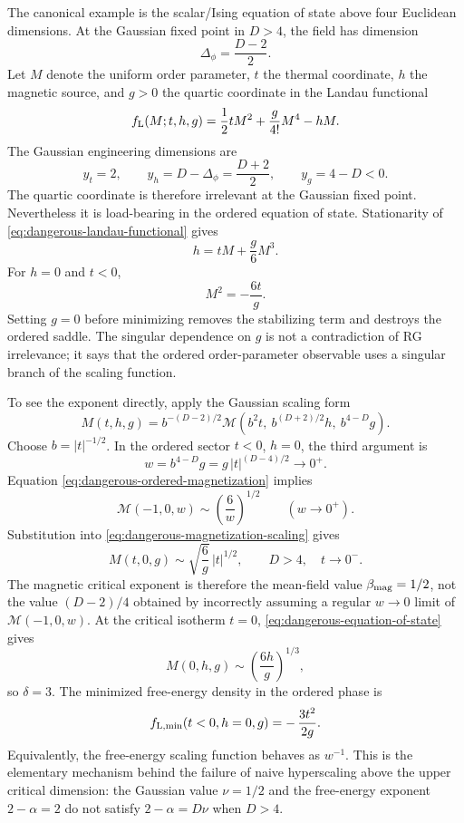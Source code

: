 The canonical example is the scalar/Ising equation of state above four
Euclidean dimensions.  At the Gaussian fixed point in \(D>4\), the field has
dimension
\[
  \Delta_\phi=\frac{D-2}{2}.
\]
Let \(M\) denote the uniform order parameter, \(t\) the thermal coordinate,
\(h\) the magnetic source, and \(g>0\) the quartic coordinate in the Landau
functional
\begin{equation}
  f_{\rm L}(M;t,h,g)
  =
  \frac12 tM^2+\frac{g}{4!}M^4-hM .
  \label{eq:dangerous-landau-functional}
\end{equation}
The Gaussian engineering dimensions are
\[
  y_t=2,\qquad
  y_h=D-\Delta_\phi=\frac{D+2}{2},\qquad
  y_g=4-D<0 .
\]
The quartic coordinate is therefore irrelevant at the Gaussian fixed point.
Nevertheless it is load-bearing in the ordered equation of state.  Stationarity
of \eqref{eq:dangerous-landau-functional} gives
\begin{equation}
  h=tM+\frac{g}{6}M^3 .
  \label{eq:dangerous-equation-of-state}
\end{equation}
For \(h=0\) and \(t<0\),
\begin{equation}
  M^2=-\frac{6t}{g}.
  \label{eq:dangerous-ordered-magnetization}
\end{equation}
Setting \(g=0\) before minimizing removes the stabilizing term and destroys
the ordered saddle.  The singular dependence on \(g\) is not a contradiction
of RG irrelevance; it says that the ordered order-parameter observable uses a
singular branch of the scaling function.

To see the exponent directly, apply the Gaussian scaling form
\begin{equation}
  M(t,h,g)
  =
  b^{-(D-2)/2}
  {\mathcal M}
  \left(b^2t,\ b^{(D+2)/2}h,\ b^{4-D}g\right).
  \label{eq:dangerous-magnetization-scaling}
\end{equation}
Choose \(b=|t|^{-1/2}\).  In the ordered sector \(t<0\), \(h=0\), the third
argument is
\[
  w=b^{4-D}g=g\,|t|^{(D-4)/2}\to0^+ .
\]
Equation \eqref{eq:dangerous-ordered-magnetization} implies
\[
  {\mathcal M}(-1,0,w)\sim \left(\frac6w\right)^{1/2}
  \qquad (w\to0^+).
\]
Substitution into \eqref{eq:dangerous-magnetization-scaling} gives
\begin{equation}
  M(t,0,g)
  \sim
  \sqrt{\frac6g}\,|t|^{1/2},
  \qquad D>4,\quad t\to0^- .
  \label{eq:dangerous-mean-field-beta}
\end{equation}
The magnetic critical exponent is therefore the mean-field value
\(\beta_{\rm mag}=1/2\), not the value \((D-2)/4\) obtained by incorrectly
assuming a regular \(w\to0\) limit of
\({\mathcal M}(-1,0,w)\).  At the critical isotherm \(t=0\),
\eqref{eq:dangerous-equation-of-state} gives
\[
  M(0,h,g)\sim\left(\frac{6h}{g}\right)^{1/3},
\]
so \(\delta=3\).  The minimized free-energy density in the ordered phase is
\[
  f_{\rm L,min}(t<0,h=0,g)
  =
  -\,\frac{3t^2}{2g}.
\]
Equivalently, the free-energy scaling function behaves as \(w^{-1}\).  This
is the elementary mechanism behind the failure of naive hyperscaling above
the upper critical dimension: the Gaussian value \(\nu=1/2\) and the
free-energy exponent \(2-\alpha=2\) do not satisfy
\(2-\alpha=D\nu\) when \(D>4\).

